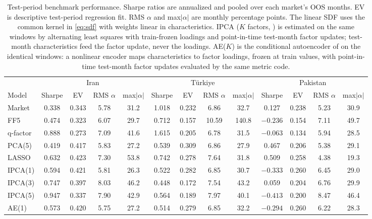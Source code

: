 \documentclass[12pt]{article}
\begin{document}
\begin{table}[htbp]
\centering
\caption{Test-period benchmark performance. Sharpe ratios are annualized and pooled over each market's OOS months. EV is descriptive test-period regression fit. RMS $\alpha$ and max$|\alpha|$ are monthly percentage points. The linear SDF uses the common kernel in \eqref{eq:sdf} with weights linear in characteristics. IPCA ($K$ factors, \citealp{kps2019}) is estimated on the same windows by alternating least squares with train-frozen loadings and point-in-time test-month factor updates; test-month characteristics feed the factor update, never the loadings. AE($K$) is the conditional autoencoder of \citet{gkx2021} on the identical windows: a nonlinear encoder maps characteristics to factor loadings, frozen at train values, with point-in-time test-month factor updates evaluated by the same metric code.}
\label{tab:bench}
\scriptsize
\setlength{\tabcolsep}{3pt}
\begin{tabular}{l cccc cccc cccc}
\toprule
 & \multicolumn{4}{c}{Iran} & \multicolumn{4}{c}{T\"urkiye} & \multicolumn{4}{c}{Pakistan} \\
\cmidrule(lr){2-5}\cmidrule(lr){6-9}\cmidrule(lr){10-13}
Model & Sharpe & EV & RMS $\alpha$ & max$|\alpha|$ & Sharpe & EV & RMS $\alpha$ & max$|\alpha|$ & Sharpe & EV & RMS $\alpha$ & max$|\alpha|$ \\
\midrule
Market & 0.338 & 0.343 & 5.78 & 31.2 & 1.018 & 0.232 & 6.86 & 32.7 & 0.127 & 0.238 & 5.23 & 30.9 \\
FF5 & 0.474 & 0.323 & 6.07 & 29.7 & 0.712 & 0.157 & 10.59 & 140.8 & $-0.236$ & 0.154 & 7.11 & 49.7 \\
q-factor & 0.888 & 0.273 & 7.09 & 41.6 & 1.615 & 0.205 & 6.78 & 31.5 & $-0.063$ & 0.134 & 5.94 & 28.5 \\
PCA(5) & 0.419 & 0.417 & 5.83 & 27.2 & 0.539 & 0.309 & 6.86 & 27.9 & 0.467 & 0.206 & 5.38 & 29.1 \\
LASSO & 0.632 & 0.423 & 7.30 & 53.8 & 0.742 & 0.278 & 7.64 & 31.8 & 0.509 & 0.258 & 4.38 & 19.3 \\
IPCA(1) & 0.594 & 0.421 & 5.81 & 26.3 & 0.522 & 0.282 & 6.85 & 30.7 & $-0.333$ & 0.260 & 6.45 & 29.0 \\
IPCA(3) & 0.747 & 0.397 & 8.03 & 46.2 & 0.448 & 0.172 & 7.54 & 43.2 & 0.059 & 0.204 & 6.76 & 29.9 \\
IPCA(5) & 0.947 & 0.337 & 7.90 & 42.9 & 0.564 & 0.189 & 7.97 & 40.1 & $-0.413$ & 0.200 & 8.47 & 46.4 \\
AE(1) & 0.573 & 0.420 & 5.75 & 27.2 & 0.514 & 0.279 & 6.85 & 32.2 & $-0.294$ & 0.260 & 6.22 & 28.3 \\

\end{tabular}
\end{table}
\end{document}
